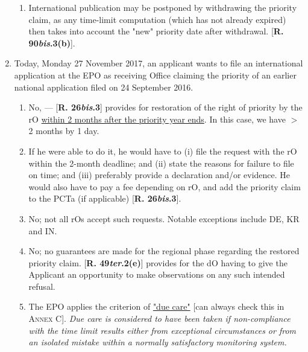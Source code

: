 \documentclass{report}
\begin{document}
\begin{enumerate}[label=\textbf{Answer \arabic*}]
\begin{enumerate}[label=(\alph*)]
\item International publication may be postponed by withdrawing the priority claim, as any time-limit computation (which has not already expired) then takes into account the "new" priority date after withdrawal. [\textbf{R. 90\textit{bis}.3(b)}].

     \end{enumerate}

\item %

Today, Monday 27 November 2017, an applicant wants to file an international application at the EPO as receiving Office claiming the priority of an earlier national application filed on 24 September 2016.

    \begin{enumerate}[label=(\alph*)]
        \item  No, --- [\textbf{R. 26\textit{bis}.3}] provides for restoration of the right of priority by the rO \newline \underline{within 2 months after the priority year ends}. In this case, we have $>$2 months by 1 day.
\item  If he were able to do it, he would have to (i) file the request with the rO within the 2-month deadline; and (ii) state the reasons for failure to file on time; and (iii) preferably provide a declaration and/or evidence. He would also have to pay a fee depending on rO, and add the priority claim to the PCTa (if applicable) [\textbf{R. 26\textit{bis}.3}].
\item  No; not all rOs accept such requests. Notable exceptions include \textsc{DE}, \textsc{KR} and \textsc{IN}. 

\item No; no guarantees are made for the regional phase regarding the restored priority claim. [\textbf{R. 49\textit{ter}.2(e)}] provides for the dO having to give the Applicant an opportunity to make observations on any such intended refusal.
\item The EPO applies the criterion of \underline{"due care"} [can always check this in \textsc{Annex C}]. \textit{Due care is considered to have been taken if non-compliance with the time limit results either from exceptional circumstances or from an isolated mistake within a normally satisfactory monitoring system.}

     \end{enumerate}
       \end{enumerate}
\end{document}
